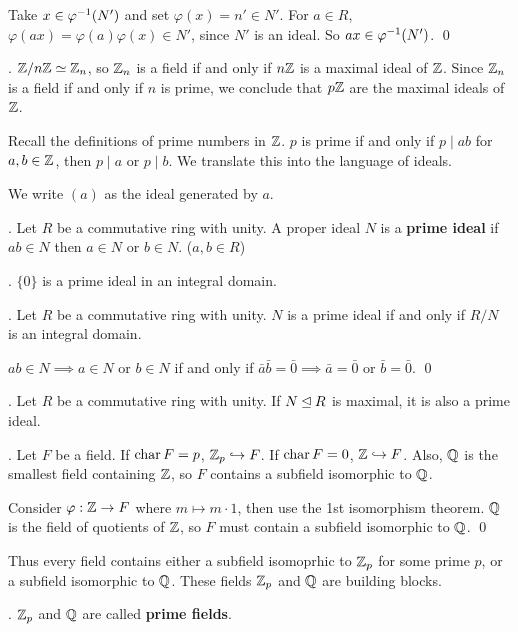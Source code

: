\pf {} Take \(x \in \varphi^{-1}(N')\) and set \(\varphi(x) = n' \in N'\). For \(a \in R\), \(\varphi(ax) = \varphi(a)\varphi(x) \in N'\), since \(N'\) is an ideal. So \(ax \in \varphi^{-1}(N')\). \qed

\ex. \(\mathbb{Z}/n\mathbb{Z} \simeq \mathbb{Z}_n\), so \(\mathbb{Z}_n\) is a field if and only if \(n\mathbb{Z}\) is a maximal ideal of \(\mathbb{Z}\). Since \(\mathbb{Z}_n\) is a field if and only if \(n\) is prime, we conclude that \(p\mathbb{Z}\) are the maximal ideals of \(\mathbb{Z}\).

Recall the definitions of prime numbers in \(\mathbb{Z}\). \(p\) is prime if and only if \(p \mid ab\) for \(a, b \in \mathbb{Z}\), then \(p \mid a\) or \(p \mid b\). We translate this into the language of ideals.

\notation We write \((a)\) as the ideal generated by \(a\).

.  Let \(R\) be a commutative ring with unity. A proper ideal \(N\) is a \textbf{prime ideal} if \(ab \in N\) then \(a \in N\) or \(b \in N\). (\(a, b \in R\))

\ex. \(\{0\}\) is a prime ideal in an integral domain.

\thm. Let \(R\) be a commutative ring with unity. \(N\) is a prime ideal if and only if \(R/N\) is an integral domain.

\pf \(ab \in N \implies a \in N\) or \(b \in N\) if and only if \(\bar{a}\bar{b} = \bar{0} \implies \bar{a} = \bar{0}\) or \(\bar{b} = \bar{0}\). \qed

\cor. Let \(R\) be a commutative ring with unity. If \(N \unlhd R\) is maximal, it is also a prime ideal.

\thm. Let \(F\) be a field. If \(\operatorname{char} F = p\), \(\mathbb{Z}_p \hookrightarrow F\). If \(\operatorname{char} F = 0\), \(\mathbb{Z} \hookrightarrow F\). Also, \(\mathbb{Q}\) is the smallest field containing \(\mathbb{Z}\), so \(F\) contains a subfield isomorphic to \(\mathbb{Q}\).

\begin{center}
\end{center}

\pf Consider \(\varphi: \mathbb{Z} \rightarrow F\) where \(m \mapsto m \cdot 1\), then use the 1st isomorphism theorem. \(\mathbb{Q}\) is the field of quotients of \(\mathbb{Z}\), so \(F\) must contain a subfield isomorphic to \(\mathbb{Q}\). \qed

Thus every field contains either a subfield isomoprhic to \(\mathbb{Z}_p\) for some prime \(p\), or a subfield isomorphic to \(\mathbb{Q}\). These fields \(\mathbb{Z}_p\) and \(\mathbb{Q}\) are building blocks.

. \(\mathbb{Z}_p\) and \(\mathbb{Q}\) are called \textbf{prime fields}.

\pagebreak

